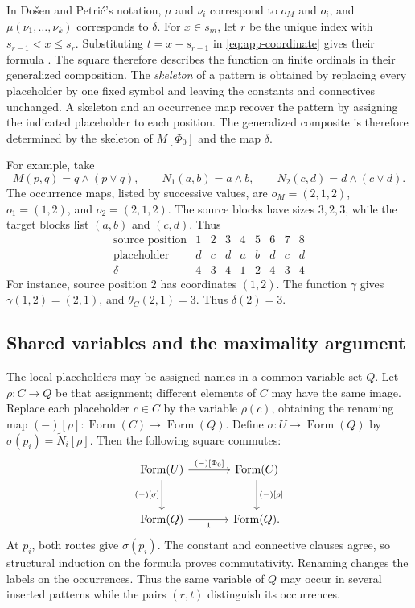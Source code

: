 \documentclass[11pt]{article}
\newcommand{\FormulaSet}{\operatorname{Form}}
\begin{document}
In Do\v{s}en and Petri\'c's notation, $\mu$ and $\nu_i$ correspond to
$o_M$ and $o_i$, and $\mu(\nu_1,\ldots,\nu_k)$ corresponds to $\delta$.
For $x\in\underline{s_m}$, let $r$ be the unique index with
$s_{r-1}<x\leq s_r$. Substituting $t=x-s_{r-1}$ in
\eqref{eq:app-coordinate} gives their formula
\cite[\S2.5, p.~46]{DP}. The square therefore describes the
function on finite ordinals in their generalized composition.
The \emph{skeleton} of a pattern is obtained by replacing every
placeholder by one fixed symbol and leaving the constants and
connectives unchanged. A skeleton and an occurrence map recover
the pattern by assigning the indicated placeholder to each position.
The generalized composite is therefore determined by the skeleton
of $M[\Phi_0]$ and the map $\delta$.

For example, take
\[
 M(p,q)=q\wedge(p\vee q),\qquad
 N_1(a,b)=a\wedge b,\qquad
 N_2(c,d)=d\wedge(c\vee d).
\]
The occurrence maps, listed by successive values, are
$o_M=(2,1,2)$, $o_1=(1,2)$, and $o_2=(2,1,2)$.
The source blocks have sizes $3,2,3$, while the target blocks list
$(a,b)$ and $(c,d)$. Thus
\[
\begin{array}{c|ccc|cc|ccc}
 \text{source position}&1&2&3&4&5&6&7&8\\\hline
 \text{placeholder}&d&c&d&a&b&d&c&d\\
 \delta&4&3&4&1&2&4&3&4
\end{array}
\]
For instance, source position $2$ has coordinates $(1,2)$.
The function $\gamma$ gives $\gamma(1,2)=(2,1)$, and
$\theta_C(2,1)=3$. Thus $\delta(2)=3$.

\subsection{Shared variables and the maximality argument}\label{app:shared}

The local placeholders may be assigned names in a common variable
set $Q$. Let $\rho:C\to Q$ be that assignment; different elements
of $C$ may have the same image. Replace each placeholder $c\in C$
by the variable $\rho(c)$, obtaining the renaming map
$(-)[\rho]:\FormulaSet(C)\to\FormulaSet(Q)$. Define
$\sigma:U\to\FormulaSet(Q)$ by
$\sigma(p_i)=\widetilde N_i[\rho]$.
Then the following square commutes:
\begin{equation}\label{eq:app-renaming}
\begin{tikzcd}[column sep=large,row sep=large]
 \FormulaSet(U)\arrow[r,"{(-)[\Phi_0]}"]
    \arrow[d,"{(-)[\sigma]}"']
   &\FormulaSet(C)\arrow[d,"{(-)[\rho]}"]\\
 \FormulaSet(Q)\arrow[r,"1"']&\FormulaSet(Q).
\end{tikzcd}
\end{equation}
At $p_i$, both routes give $\sigma(p_i)$. The constant and connective
clauses agree, so structural induction on the formula proves commutativity.
Renaming changes the labels on the occurrences. Thus the same variable
of $Q$ may occur in several inserted patterns while the pairs $(r,t)$
distinguish its occurrences.
\end{document}
